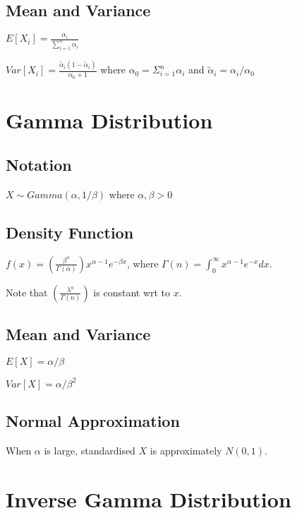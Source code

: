 \documentclass{article}
\begin{document}
\begin{multicols*}{3}
\subsection*{Mean and Variance}

$E[X_{i}] = \frac{\alpha_{i}}{\sum_{i=1}^{n} \alpha_{i}}$

$Var[X_{i}] = \frac{\tilde{\alpha}_{i}(1-\tilde{\alpha}_{i})}{\alpha_{0} + 1}$
where $\alpha_{0} = \Sigma_{i=1}^{n} \alpha_{i}$ and $\tilde{\alpha}_{i} = \alpha_{i} / \alpha_{0}$

\section{Gamma Distribution}
\label{sec:gamma-distribution}

\subsection*{Notation}

$X \sim Gamma(\alpha, 1 / \beta)$ where $\alpha, \beta > 0$

\subsection*{Density Function}

$f(x) = (\frac{\beta^{\alpha}}{\Gamma(\alpha)}) x^{\alpha-1} e^{-\beta x}$, where $\Gamma(n) = \int^{\infty}_{0} x^{\alpha-1}e^{- x} dx$.

Note that $(\frac{\lambda^{n}}{\Gamma(n)})$ is constant wrt to $x$.

\subsection*{Mean and Variance}

$E[X] = \alpha / \beta$

$Var[X] = \alpha / \beta^{2}$

\subsection*{Normal Approximation}

When $\alpha$ is large, standardised $X$ is approximately $N(0,1)$.

\section{Inverse Gamma Distribution}
\label{sec:inverse-gamma-dist}


\end{multicols*}
\end{document}
